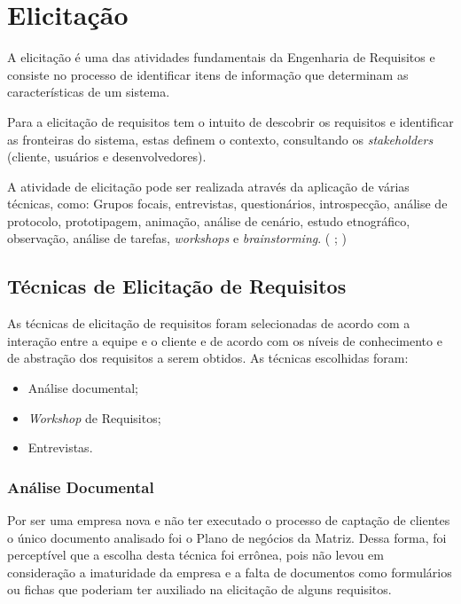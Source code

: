 \chapter[Elicitação]{Elicitação}
A elicitação é uma das atividades fundamentais da Engenharia de Requisitos e consiste no processo de identificar
itens de informação que determinam as características de um sistema. \cite{jitnah} 

Para  a elicitação de requisitos tem o intuito de descobrir
os requisitos e identificar as fronteiras do sistema, estas definem o contexto, consultando os \textit{stakeholders} (cliente, usuários e desenvolvedores).

A atividade de elicitação pode ser realizada através da aplicação de várias técnicas, como: Grupos focais, entrevistas, questionários,
introspecção, análise de protocolo, prototipagem, animação, análise de cenário, estudo etnográfico, observação, análise de tarefas,
\textit{workshops} e \textit{brainstorming}. (\cite{jitnah} ; \cite{coulin})

\section{Técnicas de Elicitação de Requisitos}
\label{tecnicas}

As técnicas de elicitação de requisitos foram selecionadas de acordo com a interação entre a equipe e o cliente e de acordo com os níveis de conhecimento e de abstração dos requisitos a serem obtidos.
As técnicas escolhidas foram:\\
\begin{itemize}
\item Análise documental;
\item \textit{Workshop} de Requisitos;
\item Entrevistas.
\end{itemize}

\subsection{Análise Documental}
Por ser uma empresa nova e não ter executado o processo de captação de clientes o único documento analisado foi o Plano
de negócios da Matriz. Dessa forma, foi perceptível que a escolha desta técnica foi errônea, pois não levou
em consideração a imaturidade da empresa e a falta de documentos como formulários ou fichas que poderiam ter auxiliado
na elicitação de alguns requisitos.


